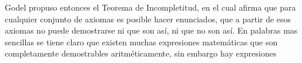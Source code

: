 \documentclass[12pt]{article}
\begin{document}
\vspace{10PT}
Godel propuso entonces el Teorema de Incompletitud, en el cual afirma que para cualquier conjunto de axiomas es posible hacer enunciados, que a partir de esos axiomas no puede demostrarse ni que son así, ni que no son así. En palabras mas sencillas se tiene claro que existen muchas expresiones matemáticas que son completamente demostrables aritméticamente, sin embargo hay expresiones 



 
\end{document}
